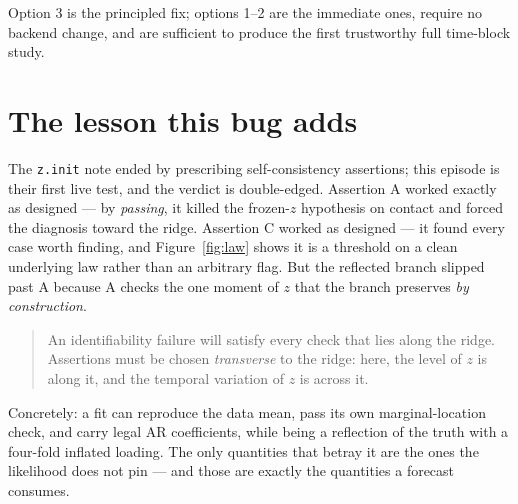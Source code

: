\documentclass[11pt]{article}
\newcommand{\code}[1]{\texttt{#1}}
\begin{document}
Option 3 is the principled fix; options 1--2 are the immediate ones, require no
backend change, and are sufficient to produce the first trustworthy full
time-block study.

\section{The lesson this bug adds}

The \code{z.init} note ended by prescribing self-consistency assertions;
this episode is their first live test, and the verdict is double-edged.
Assertion A worked exactly as designed --- by \emph{passing}, it killed the
frozen-$z$ hypothesis on contact and forced the diagnosis toward the ridge.
Assertion C worked as designed --- it found every case worth finding, and
Figure~\ref{fig:law} shows it is a threshold on a clean underlying law rather
than an arbitrary flag. But the reflected branch slipped past A because A
checks the one moment of $z$ that the branch preserves \emph{by construction}.

\begin{quote}
An identifiability failure will satisfy every check that lies along the ridge.
Assertions must be chosen \emph{transverse} to the ridge: here, the level of
$z$ is along it, and the temporal variation of $z$ is across it.
\end{quote}

Concretely: a fit can reproduce the data mean, pass its own marginal-location
check, and carry legal AR coefficients, while being a reflection of the truth
with a four-fold inflated loading. The only quantities that betray it are the
ones the likelihood does not pin --- and those are exactly the quantities a
forecast consumes.
\end{document}

